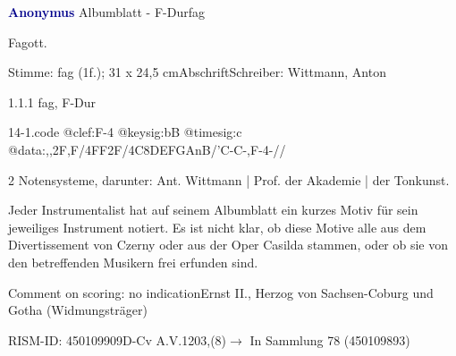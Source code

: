 \documentclass[a4paper, twocolumn, 11pt]{book}
\begin{document}
\par \vspace{16pt} \textcolor{darkblue}{\textbf{Anonymus  }}\hfillplus{[14]}\newline Albumblatt - F-Dur\newline fag
\par \begin{itshape}[heading:] Fagott.\end{itshape} 
\par \textcolor{darkblue}{}  Stimme: fag  (1f.); 31 x 24,5 cm\newline Abschrift\newline Schreiber: Wittmann, Anton
\par 1.1.1  fag, F-Dur  
\begin{filecontents*}{14-1.code}
@clef:F-4
@keysig:bB
@timesig:c
@data:,,2F,F/4FF2F/4C{8DE}{FGAnB}/'C-C-,F-4-//
\end{filecontents*}
\newline %
\par 2 Notensysteme, darunter: Ant. Wittmann | Prof. der Akademie | der Tonkunst.
\par Jeder Instrumentalist hat auf seinem Albumblatt ein kurzes Motiv für sein jeweiliges Instrument notiert. Es ist nicht klar, ob diese Motive alle aus dem {\textquotedbl}Divertissement{\textquotedbl} von Czerny oder aus der Oper {\textquotedbl}Casilda{\textquotedbl} stammen, oder ob sie von den betreffenden Musikern frei erfunden sind.
\par Comment on scoring: no indication\newline Ernst II., Herzog von Sachsen-Coburg und Gotha  (Widmungsträger)
\par RISM-ID: 450109909\newline D-Cv  A.V.1203,(8)\newline $\rightarrow$ In Sammlung 78 (450109893)
      
\end{document}

